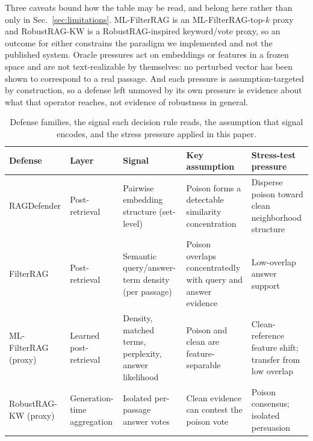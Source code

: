 \documentclass[conference]{IEEEtran}
\begin{document}
Three caveats bound how the table may be read, and belong here rather than only
in Sec.~\ref{sec:limitations}. ML-FilterRAG is an ML-FilterRAG-top-$k$ proxy and
RobustRAG-KW is a RobustRAG-inspired keyword/vote proxy, so an outcome for
either constrains the paradigm we implemented and not the published system.
Oracle pressures act on embeddings or features in a frozen space and are not
text-realizable by themselves: no perturbed vector has been shown to correspond
to a real passage. And each pressure is assumption-targeted by construction, so
a defense left unmoved by its own pressure is evidence about what that operator
reaches, not evidence of robustness in general.

\begin{table}[!t]
\centering
\caption{Defense families, the signal each decision rule reads, the assumption
that signal encodes, and the stress pressure applied in this paper.}
\label{tab:defense_assumptions}
\scriptsize
\setlength{\tabcolsep}{3pt}
\renewcommand{\arraystretch}{1.05}
\begin{tabular}{@{}p{}p{}p{}p{}p{}@{}}
\toprule
Defense & Layer & Signal & Key assumption & Stress-test pressure \\
\midrule
RAGDefender
  & Post-re\-trieval
  & Pairwise embedding structure (set-level)
  & Poison forms a detectable similarity concentration
  & Disperse poison toward clean neighborhood structure \\
\addlinespace[2pt]
FilterRAG
  & Post-re\-trieval
  & Semantic query/answer-term density (per passage)
  & Poison overlaps concentratedly with query and answer evidence
  & Low-overlap answer support \\
\addlinespace[2pt]
ML-FilterRAG (proxy)
  & Learned post-re\-trieval
  & Density, matched terms, perplexity, answer likelihood
  & Poison and clean are feature-separable
  & Clean-reference feature shift; transfer from low overlap \\
\addlinespace[2pt]
RobustRAG-KW (proxy)
  & Genera\-tion-time aggre\-gation
  & Isolated per-passage answer votes
  & Clean evidence can contest the poison vote
  & Poison consensus; isolated persuasion \\
\bottomrule
\end{tabular}
\end{table}
\end{document}
